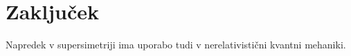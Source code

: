 \section{Zaklju\v cek}

Napredek v supersimetriji ima uporabo tudi v nerelativisti\v cni kvantni mehaniki.
